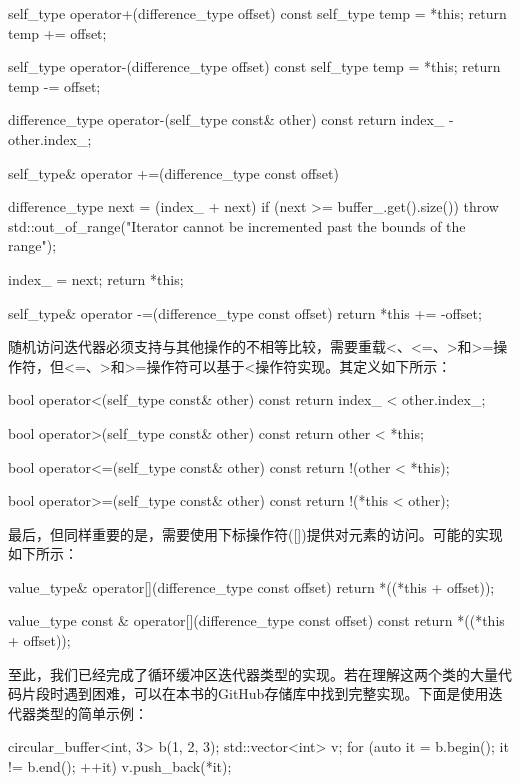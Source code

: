 \begin{cpp}
self_type operator+(difference_type offset) const
{
	self_type temp = *this;
	return temp += offset;
}

self_type operator-(difference_type offset) const
{
	self_type temp = *this;
	return temp -= offset;
}

difference_type operator-(self_type const& other) const
{
	return index_ - other.index_;
}

self_type& operator +=(difference_type const offset)
{
	difference_type next =
		(index_ + next) %
	if (next >= buffer_.get().size())
		throw std::out_of_range("Iterator cannot be
								 incremented past the bounds of the range");
								 
	index_ = next;
	return *this;
}

self_type& operator -=(difference_type const offset)
{
	return *this += -offset;
}
\end{cpp}

随机访问迭代器必须支持与其他操作的不相等比较，需要重载<、<=、>和>=操作符，但<=、>和>=操作符可以基于<操作符实现。其定义如下所示：

\begin{cpp}
bool operator<(self_type const& other) const
{
	return index_ < other.index_;
}

bool operator>(self_type const& other) const
{
	return other < *this;
}

bool operator<=(self_type const& other) const
{
	return !(other < *this);
}

bool operator>=(self_type const& other) const
{
	return !(*this < other);
}
\end{cpp}

最后，但同样重要的是，需要使用下标操作符([])提供对元素的访问。可能的实现如下所示：

\begin{cpp}
value_type& operator[](difference_type const offset)
{
	return *((*this + offset));
}

value_type const & operator[](difference_type const offset)
const
{
	return *((*this + offset));
}
\end{cpp}

至此，我们已经完成了循环缓冲区迭代器类型的实现。若在理解这两个类的大量代码片段时遇到困难，可以在本书的GitHub存储库中找到完整实现。下面是使用迭代器类型的简单示例：

\begin{cpp}
circular_buffer<int, 3> b({1, 2, 3});
std::vector<int> v;
for (auto it = b.begin(); it != b.end(); ++it)
{
	v.push_back(*it);
}
\end{cpp}

